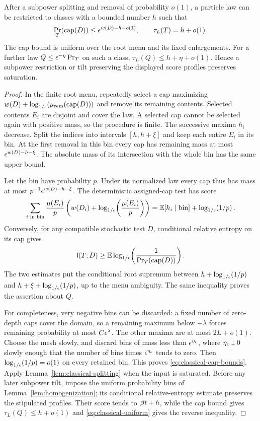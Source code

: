 \begin{lemma}
\label{lem:classical-cap-regularization}
After a subpower splitting and removal of probability $o(1)$, a particle
law can be restricted to classes with a bounded number $h$ such that
\begin{equation}
 \Pr_T(\operatorname{cap}(D))
       \le\epsilon^{w(D)-h-o(1)},\qquad \tau_L(T)=h+o(1).
 \label{eq:classical-cap-bounds}
\end{equation}
The cap bound is uniform over the root menu and its fixed enlargements.
For a further law $Q\le\epsilon^{-\eta}\Pr_T$ on such a class,
$\tau_L(Q)\le h+\eta+o(1)$.  Hence a subpower restriction or tilt
preserving the displayed score profiles preserves saturation.
\end{lemma}
\begin{proof}
In the finite root menu, repeatedly select a cap maximizing
$w(D)+\log_{1/\epsilon}\!\left(\mu_{\rm rem}(\operatorname{cap}(D))\right)$ and remove its
remaining contents.  Selected contents $E_i$ are disjoint and cover the
law.  A selected cap cannot be selected again with positive mass, so the
procedure is finite.  The successive maxima $h_i$ decrease.  Split the
indices into intervals $[h,h+\xi]$ and keep each entire $E_i$ in its bin.
At the first removal in this bin every cap has remaining mass at most
$\epsilon^{w(D)-h-\xi}$.  The absolute mass of its intersection with the
whole bin has the same upper bound.

Let the bin have probability $p$.  Under its normalized law every cap
thus has mass at most $p^{-1}\epsilon^{w(D)-h-\xi}$.  The deterministic
assigned-cap test has score
\[
 \sum_{i\text{ in bin}}\frac{\mu(E_i)}p
       \left(w(D_i)+\log_{1/\epsilon}\!\left(\frac{\mu(E_i)}p\right)\right)
 =\mathbb E[h_i\mid\text{bin}]+\log_{1/\epsilon}\!\left(1/p\right).
\]
Conversely, for any compatible stochastic test $D$, conditional relative
entropy on its cap gives
\[
 \mathsf I(T;D)\ge
   \mathbb E\log_{1/\epsilon}\!\left(\frac1{\Pr_T(\operatorname{cap}(D))}\right).
\]
The two estimates put the conditional root supremum between
$h+\log_{1/\epsilon}\!\left(1/p\right)$ and $h+\xi+\log_{1/\epsilon}\!\left(1/p\right)$, up to the menu ambiguity.
The same inequality proves the assertion about $Q$.

For completeness, very negative bins can be discarded: a fixed number
of zero-depth caps cover the domain, so a remaining maximum below
$-\lambda$ forces remaining probability at most $C\epsilon^\lambda$.
The other maxima are at most $2L+o(1)$.  Choose the mesh slowly, and
discard bins of mass less than $\epsilon^{\eta_\epsilon}$, where
$\eta_\epsilon\downarrow0$ slowly enough that the number of bins times
$\epsilon^{\eta_\epsilon}$ tends to zero.  Then $\log_{1/\epsilon}\!\left(1/p\right)=o(1)$ on every
retained bin.  This proves \eqref{eq:classical-cap-bounds}.  Apply
Lemma~\ref{lem:classical-splitting} when the input is saturated.  Before
any later subpower tilt, impose the uniform probability bins of
Lemma~\ref{lem:homogenization}; its conditional relative-entropy
estimate preserves the stipulated profiles.  Their score tends to
$\beta t+h$, while the cap bound gives $\tau_L(Q)\le h+o(1)$ and
\eqref{eq:classical-uniform} gives the reverse inequality.
\end{proof}

